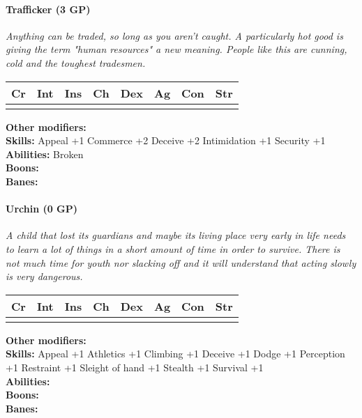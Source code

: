 \documentclass[12pt,a4paper,openany]{book}
\begin{document}
	\hrulefill
	\paragraph*{Trafficker (3 GP)}
	\textit{Anything can be traded, so long as you aren't caught. A particularly hot good is giving the term "human resources" a new meaning. People like this are cunning, cold and the toughest tradesmen.}\par
	\begin{tabular}{|l|l|l|l|l|l|l|l|}
		\hline
		Cr & Int & Ins & Ch & Dex & Ag & Con & Str \\ \hline
		&  &  &  &  &  &  &  \\ \hline
	\end{tabular}\par
	\noindent\textbf{Other modifiers:} \\
	\textbf{Skills:} Appeal +1
	Commerce +2
	Deceive +2
	Intimidation +1
	Security +1\\
	\textbf{Abilities:} Broken\\
	\textbf{Boons:} \\
	\textbf{Banes:}
	
	\hrulefill
	\paragraph*{Urchin (0 GP)}
	\textit{A child that lost its guardians and maybe its living place very early in life needs to learn a lot of things in a short amount of time in order to survive. There is not much time for youth nor slacking off and it will understand that acting slowly is very dangerous.}\par
	\begin{tabular}{|l|l|l|l|l|l|l|l|}
		\hline
		Cr & Int & Ins & Ch & Dex & Ag & Con & Str \\ \hline
		&  &  &  &  &  &  &  \\ \hline
	\end{tabular}\par
	\noindent\textbf{Other modifiers:} \\
	\textbf{Skills:} Appeal +1
	Athletics +1
	Climbing +1
	Deceive +1
	Dodge +1
	Perception +1
	Restraint +1
	Sleight of hand +1
	Stealth +1
	Survival +1\\
	\textbf{Abilities:} \\
	\textbf{Boons:} \\
	\textbf{Banes:} \\
	
	\hrulefill
\end{document}
